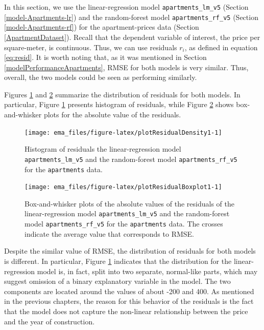\documentclass[]{krantz}
\begin{document}
In this section, we use the linear-regression model \texttt{apartments\_lm\_v5} (Section \ref{model-Apartments-lr}) and the random-forest model \texttt{apartments\_rf\_v5} (Section \ref{model-Apartments-rf}) for the apartment-prices data (Section \ref{ApartmentDataset}). Recall that the dependent variable of interest, the price per square-meter, is continuous. Thus, we can use residuals \(r_i\), as defined in equation \eqref{eq:resid}. It is worth noting that, as it was mentioned in Section \ref{modelPerformanceApartments}, RMSE for both models is very similar. Thus, overall, the two models could be seen as performing similarly.

Figures \ref{fig:plotResidualDensity1} and \ref{fig:plotResidualBoxplot1} summarize the distribution of residuals for both models. In particular, Figure \ref{fig:plotResidualDensity1} presents histogram of residuals, while Figure \ref{fig:plotResidualBoxplot1} shows box-and-whisker plots for the absolute value of the residuals.



\begin{figure}

{\centering \texttt{[image: ema\_files/figure-latex/plotResidualDensity1-1]} 

}

\caption{Histogram of residuals the linear-regression model \texttt{apartments\_lm\_v5} and the random-forest model \texttt{apartments\_rf\_v5} for the \texttt{apartments} data.}\label{fig:plotResidualDensity1}
\end{figure}



\begin{figure}

{\centering \texttt{[image: ema\_files/figure-latex/plotResidualBoxplot1-1]} 

}

\caption{Box-and-whisker plots of the absolute values of the residuals of the linear-regression model \texttt{apartments\_lm\_v5} and the random-forest model \texttt{apartments\_rf\_v5} for the \texttt{apartments} data. The crosses indicate the average value that corresponds to RMSE.}\label{fig:plotResidualBoxplot1}
\end{figure}

Despite the similar value of RMSE, the distribution of residuals for both models is different. In particular, Figure \ref{fig:plotResidualDensity1} indicates that the distribution for the linear-regression model is, in fact, split into two separate, normal-like parts, which may suggest omission of a binary explanatory variable in the model. The two components are located around the values of about -200 and 400. As mentioned in the previous chapters, the reason for this behavior of the residuals is the fact that the model does not capture the non-linear relationship between the price and the year of construction.
\end{document}
